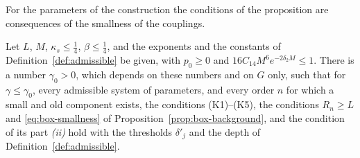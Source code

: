 \documentclass[11pt]{preprint}
\numberwithin{equation}{section}
\begin{document}
For the parameters of the construction the conditions of the proposition are consequences of the smallness of the couplings.

\begin{lemma}\label{lem:last-tests-conditions}
Let $L$, $M$, $\kappa_s \leqslant \frac{1}{4}$, $\beta \leqslant \frac{1}{4}$, and the exponents and the constants of Definition~\ref{def:admissible} be given, with $p_0 \geqslant 0$ and $16C_{14}M^6e^{-2\delta_2M} \leqslant 1$. There is a number $\gamma_0 > 0$, which depends on these numbers and on $G$ only, such that for $\gamma \leqslant \gamma_0$, every admissible system of parameters, and every order $n$ for which a small and old component exists, the conditions (K1)--(K5), the conditions $R_n \geqslant L$ and \eqref{eq:box-smallness} of Proposition~\ref{prop:box-background}, and the condition of its part \emph{(ii)} hold with the thresholds $\delta'_j$ and the depth of Definition~\ref{def:admissible}.
\end{lemma}
\end{document}
